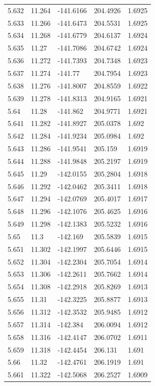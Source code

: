 \begin{tabular}{lllll}
5.632 & 11.264 & -141.6166 & 204.4926 & 1.6925 \\
5.633 & 11.266 & -141.6473 & 204.5531 & 1.6925 \\
5.634 & 11.268 & -141.6779 & 204.6137 & 1.6924 \\
5.635 & 11.27 & -141.7086 & 204.6742 & 1.6924 \\
5.636 & 11.272 & -141.7393 & 204.7348 & 1.6923 \\
5.637 & 11.274 & -141.77 & 204.7954 & 1.6923 \\
5.638 & 11.276 & -141.8007 & 204.8559 & 1.6922 \\
5.639 & 11.278 & -141.8313 & 204.9165 & 1.6921 \\
5.64 & 11.28 & -141.862 & 204.9771 & 1.6921 \\
5.641 & 11.282 & -141.8927 & 205.0378 & 1.692 \\
5.642 & 11.284 & -141.9234 & 205.0984 & 1.692 \\
5.643 & 11.286 & -141.9541 & 205.159 & 1.6919 \\
5.644 & 11.288 & -141.9848 & 205.2197 & 1.6919 \\
5.645 & 11.29 & -142.0155 & 205.2804 & 1.6918 \\
5.646 & 11.292 & -142.0462 & 205.3411 & 1.6918 \\
5.647 & 11.294 & -142.0769 & 205.4017 & 1.6917 \\
5.648 & 11.296 & -142.1076 & 205.4625 & 1.6916 \\
5.649 & 11.298 & -142.1383 & 205.5232 & 1.6916 \\
5.65 & 11.3 & -142.169 & 205.5839 & 1.6915 \\
5.651 & 11.302 & -142.1997 & 205.6446 & 1.6915 \\
5.652 & 11.304 & -142.2304 & 205.7054 & 1.6914 \\
5.653 & 11.306 & -142.2611 & 205.7662 & 1.6914 \\
5.654 & 11.308 & -142.2918 & 205.8269 & 1.6913 \\
5.655 & 11.31 & -142.3225 & 205.8877 & 1.6913 \\
5.656 & 11.312 & -142.3532 & 205.9485 & 1.6912 \\
5.657 & 11.314 & -142.384 & 206.0094 & 1.6912 \\
5.658 & 11.316 & -142.4147 & 206.0702 & 1.6911 \\
5.659 & 11.318 & -142.4454 & 206.131 & 1.691 \\
5.66 & 11.32 & -142.4761 & 206.1919 & 1.691 \\
5.661 & 11.322 & -142.5068 & 206.2527 & 1.6909 \\

\end{tabular}
